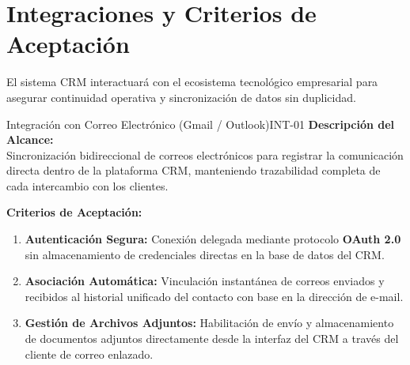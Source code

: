 \section{Integraciones y Criterios de Aceptación}

El sistema CRM interactuará con el ecosistema tecnológico empresarial para asegurar continuidad operativa y sincronización de datos sin duplicidad.

\begin{IntegrationBox}{Integración con Correo Electrónico (Gmail / Outlook)}{INT-01}
    \sffamily
    \textbf{\textcolor{PrimaryNavy}{Descripción del Alcance:}}\\
    Sincronización bidireccional de correos electrónicos para registrar la comunicación directa dentro de la plataforma CRM, manteniendo trazabilidad completa de cada intercambio con los clientes.
    
    \vspace{0.2cm}
    \textbf{\textcolor{PrimaryNavy}{Criterios de Aceptación:}}
    \begin{enumerate}[label=\textbf{\arabic*.}]
        \item \textbf{Autenticación Segura:} Conexión delegada mediante protocolo \textbf{OAuth 2.0} sin almacenamiento de credenciales directas en la base de datos del CRM.
        \item \textbf{Asociación Automática:} Vinculación instantánea de correos enviados y recibidos al historial unificado del contacto con base en la dirección de e-mail.
        \item \textbf{Gestión de Archivos Adjuntos:} Habilitación de envío y almacenamiento de documentos adjuntos directamente desde la interfaz del CRM a través del cliente de correo enlazado.
    \end{enumerate}
\end{IntegrationBox}

